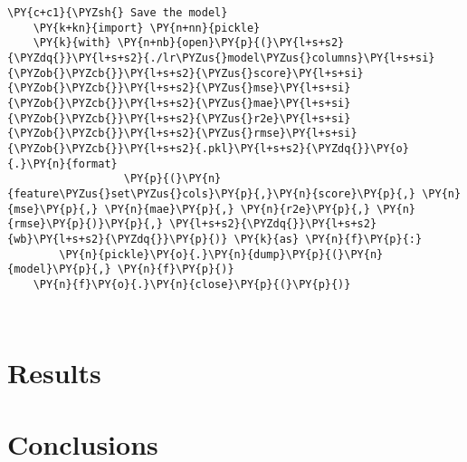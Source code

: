         \begin{tcolorbox}[breakable, size=fbox, boxrule=1pt, pad at break*=1mm,colback=cellbackground, colframe=cellborder]
    \begin{Verbatim}[commandchars=\\\{\}]
    \PY{c+c1}{\PYZsh{} Save the model}
    \PY{k+kn}{import} \PY{n+nn}{pickle}
    \PY{k}{with} \PY{n+nb}{open}\PY{p}{(}\PY{l+s+s2}{\PYZdq{}}\PY{l+s+s2}{./lr\PYZus{}model\PYZus{}columns}\PY{l+s+si}{\PYZob{}\PYZcb{}}\PY{l+s+s2}{\PYZus{}score}\PY{l+s+si}{\PYZob{}\PYZcb{}}\PY{l+s+s2}{\PYZus{}mse}\PY{l+s+si}{\PYZob{}\PYZcb{}}\PY{l+s+s2}{\PYZus{}mae}\PY{l+s+si}{\PYZob{}\PYZcb{}}\PY{l+s+s2}{\PYZus{}r2e}\PY{l+s+si}{\PYZob{}\PYZcb{}}\PY{l+s+s2}{\PYZus{}rmse}\PY{l+s+si}{\PYZob{}\PYZcb{}}\PY{l+s+s2}{.pkl}\PY{l+s+s2}{\PYZdq{}}\PY{o}{.}\PY{n}{format}
                  \PY{p}{(}\PY{n}{feature\PYZus{}set\PYZus{}cols}\PY{p}{,}\PY{n}{score}\PY{p}{,} \PY{n}{mse}\PY{p}{,} \PY{n}{mae}\PY{p}{,} \PY{n}{r2e}\PY{p}{,} \PY{n}{rmse}\PY{p}{)}\PY{p}{,} \PY{l+s+s2}{\PYZdq{}}\PY{l+s+s2}{wb}\PY{l+s+s2}{\PYZdq{}}\PY{p}{)} \PY{k}{as} \PY{n}{f}\PY{p}{:}
        \PY{n}{pickle}\PY{o}{.}\PY{n}{dump}\PY{p}{(}\PY{n}{model}\PY{p}{,} \PY{n}{f}\PY{p}{)}
    \PY{n}{f}\PY{o}{.}\PY{n}{close}\PY{p}{(}\PY{p}{)}
    \end{Verbatim}
    \end{tcolorbox}
    
        \begin{tcolorbox}[breakable, size=fbox, boxrule=1pt, pad at break*=1mm,colback=cellbackground, colframe=cellborder]
    \begin{Verbatim}[commandchars=\\\{\}]
    
    \end{Verbatim}
    \end{tcolorbox}

\section*{Results}

\lipsum[1-3]

\section*{Conclusions}
\lipsum[1-2]

